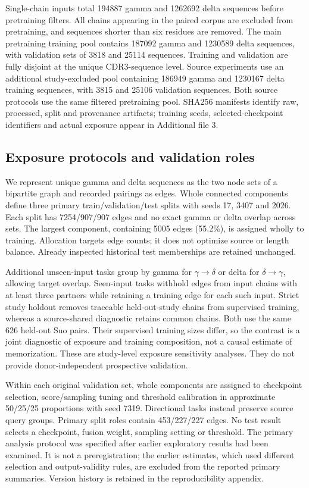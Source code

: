\documentclass[12pt]{article}
\newcommand{\gtd}{\mbox{\ensuremath{\gamma\!\rightarrow\!\delta}}}
\newcommand{\dtg}{\mbox{\ensuremath{\delta\!\rightarrow\!\gamma}}}
\begin{document}
Single-chain inputs total 194887 gamma and 1262692 delta sequences before
pretraining filters. All chains appearing in the paired corpus are excluded
from pretraining, and sequences shorter than six residues are removed. The main
pretraining training pool contains 187092 gamma and 1230589 delta sequences,
with validation sets of 3818 and 25114 sequences. Training and validation are
fully disjoint at the unique CDR3-sequence level. Source experiments
use an additional study-excluded pool containing 186949 gamma and 1230167
delta training sequences, with 3815 and 25106 validation sequences. Both source
protocols use the same filtered pretraining pool. SHA256 manifests identify raw, processed, split and provenance artifacts;
training seeds, selected-checkpoint identifiers and actual exposure appear in Additional file 3.

\subsection{Exposure protocols and validation roles}
We represent unique gamma and delta sequences as the two node sets of a
bipartite graph and recorded pairings as edges. Whole connected components define
three primary train/validation/test splits with seeds 17, 3407 and 2026. Each
split has 7254/907/907 edges and no exact gamma or delta overlap across sets.
The largest component, containing 5005 edges (55.2\%), is assigned wholly to
training. Allocation targets edge counts;
it does not optimize source or length balance. Already inspected historical
test memberships are retained unchanged.

Additional unseen-input tasks group by gamma for \gtd{} or delta for \dtg{},
allowing target overlap. Seen-input tasks withhold edges from input chains with
at least three partners while retaining a training edge for each such input.
Strict study holdout removes traceable held-out-study chains from supervised
training, whereas a source-shared diagnostic retains common chains. Both use
the same 626 held-out Suo pairs. Their supervised training sizes differ, so the
contrast is a joint diagnostic of exposure and training composition, not a
causal estimate of memorization. These are study-level exposure sensitivity analyses. They do not provide
donor-independent prospective validation.

Within each original validation set, whole components are assigned to checkpoint
selection, score/sampling tuning and threshold calibration in approximate
50/25/25 proportions with seed 7319. Directional tasks instead preserve source
query groups. Primary split roles contain 453/227/227 edges. No test result
selects a checkpoint, fusion weight, sampling setting or threshold. The primary analysis protocol was specified after earlier exploratory results
had been examined. It is not a preregistration; the earlier estimates, which
used different selection and output-validity rules, are excluded from the
reported primary summaries. Version history is retained in the reproducibility appendix.
\end{document}
